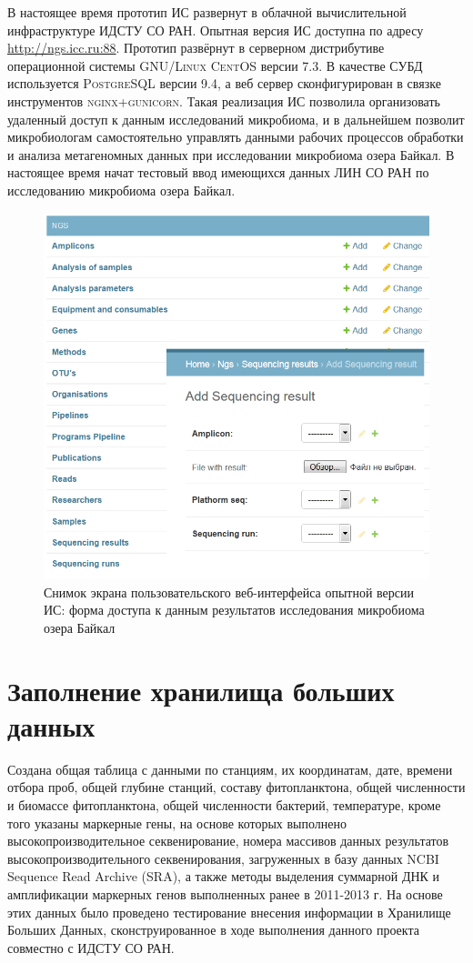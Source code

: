\documentclass[a4paper,12pt,openany,final]{extreport}
\def\oldcaption{} \let\oldcaption=\caption
\def\caption{\stepcounter{captionsnum}\oldcaption}
\begin{document}
В настоящее время прототип ИС развернут в облачной вычислительной
инфраструктуре ИДСТУ СО РАН. Опытная версия ИС доступна по адресу
\href{http://ngs.icc.ru:88}{{http://ngs.icc.ru:88}}. Прототип развёрнут
в серверном дистрибутиве операционной системы \textsc{GNU/Linux CentOS}
версии 7.3. В качестве СУБД используется \textsc{PostgreSQL} версии 9.4,
а веб сервер сконфигурирован в связке инструментов
\textsc{nginx+gunicorn}. Такая реализация ИС позволила организовать
удаленный доступ к данным исследований микробиома, и в дальнейшем
позволит микробиологам самостоятельно управлять данными рабочих
процессов обработки и анализа метагеномных данных при исследовании
микробиома озера Байкал. В настоящее время начат тестовый ввод имеющихся
данных ЛИН СО РАН по исследованию микробиома озера Байкал.

\begin{figure}\centering
\includegraphics[width=0.9\linewidth]{media/image17.png}

\caption{Снимок экрана пользовательского веб-интерфейса опытной
версии ИС: форма доступа к данным результатов исследования микробиома
озера Байкал}
\end{figure}

\chapter{Заполнение хранилища больших данных}\label{chap:8}

Создана общая таблица с данными по станциям, их координатам, дате,
времени отбора проб, общей глубине станций, составу фитопланктона, общей
численности и биомассе фитопланктона, общей численности бактерий,
температуре, кроме того указаны маркерные гены, на основе которых
выполнено высокопроизводительное секвенирование, номера массивов данных
результатов высокопроизводительного секвенирования, загруженных в базу
данных NCBI Sequence Read Archive (SRA), а также методы выделения
суммарной ДНК и амплификации маркерных генов выполненных ранее в
2011-2013 г. На основе этих данных было проведено тестирование внесения
информации в Хранилище Больших Данных, сконструированное в ходе
выполнения данного проекта совместно с ИДСТУ СО РАН.
\end{document}
